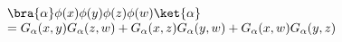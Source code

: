 \begin{equation}
  \label{eq:free14}
  \begin{array}{lll}
   \bra{\alpha}\phi(x) \phi(y) \phi(z) \phi(w)\ket{\alpha}\\ = 
G_\alpha(x,y)G_\alpha(z,w)+G_\alpha(x,z)G_\alpha(y,w)+G_\alpha(x,w)G_\alpha(y,z)\\
     \end{array}
\end{equation}

